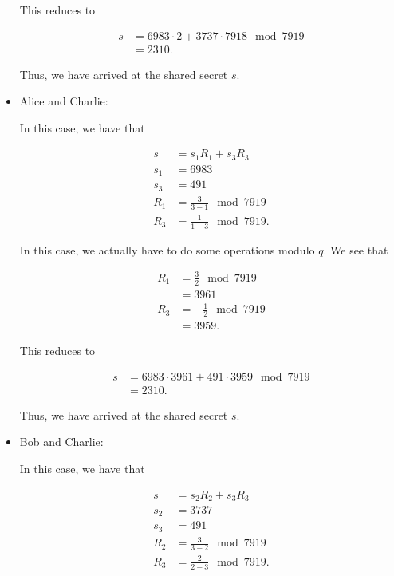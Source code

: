 \begin{example}
\begin{itemize}
\noindent
This reduces to

\begin{align}
    s &= 6983\cdot2 + 3737\cdot7918 \mod 7919 \nonumber\\
        &= 2310.
\end{align}

\noindent
Thus, we have arrived at the \gls{shared secret} $s$.

\item Alice and Charlie:

In this case, we have that

\begin{align}
    s &= s_{1}R_{1} + s_{3}R_{3} \nonumber\\
    s_{1} &= 6983 \nonumber\\
    s_{3} &= 491 \nonumber\\
    R_{1} &= \frac{3}{3-1} \mod 7919 \nonumber\\
    R_{3} &= \frac{1}{1-3} \mod 7919.
\end{align}

\noindent
In this case, we actually have to do some operations modulo $q$.
We see that

\begin{align}
    R_{1} &= \frac{3}{2} \mod 7919 \nonumber\\
        &= 3961 \nonumber\\
    R_{3} &= -\frac{1}{2} \mod 7919 \nonumber\\
        &= 3959.
\end{align}

\noindent
This reduces to

\begin{align}
    s &= 6983\cdot3961 + 491\cdot3959 \mod 7919 \nonumber\\
        &= 2310.
\end{align}

\noindent
Thus, we have arrived at the \gls{shared secret} $s$.

\item Bob and Charlie:

In this case, we have that

\begin{align}
    s &= s_{2}R_{2} + s_{3}R_{3} \nonumber\\
    s_{2} &= 3737 \nonumber\\
    s_{3} &= 491 \nonumber\\
    R_{2} &= \frac{3}{3-2} \mod 7919 \nonumber\\
    R_{3} &= \frac{2}{2-3} \mod 7919.
\end{align}


\end{itemize}
\end{example}
